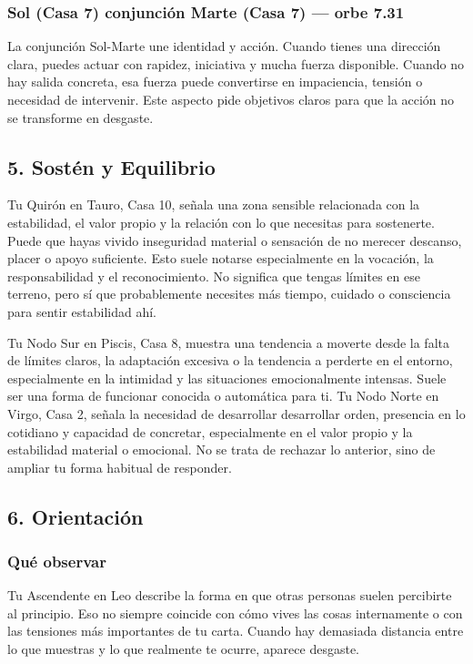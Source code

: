 \documentclass[11pt,a4paper]{article}
\begin{document}
\subsubsection*{Sol (Casa 7) conjunción Marte (Casa 7) --- orbe 7.31\textdegree}
La conjunción Sol-Marte une identidad y acción. Cuando tienes una dirección clara, puedes actuar con rapidez, iniciativa y mucha fuerza disponible. Cuando no hay salida concreta, esa fuerza puede convertirse en impaciencia, tensión o necesidad de intervenir. Este aspecto pide objetivos claros para que la acción no se transforme en desgaste.



\subsection{5. Sostén y Equilibrio}

Tu Quirón en Tauro, Casa 10, señala una zona sensible relacionada con la estabilidad, el valor propio y la relación con lo que necesitas para sostenerte. Puede que hayas vivido inseguridad material o sensación de no merecer descanso, placer o apoyo suficiente. Esto suele notarse especialmente en la vocación, la responsabilidad y el reconocimiento. No significa que tengas límites en ese terreno, pero sí que probablemente necesites más tiempo, cuidado o consciencia para sentir estabilidad ahí.

\vspace{0.3cm}
Tu Nodo Sur en Piscis, Casa 8, muestra una tendencia a moverte desde la falta de límites claros, la adaptación excesiva o la tendencia a perderte en el entorno, especialmente en la intimidad y las situaciones emocionalmente intensas. Suele ser una forma de funcionar conocida o automática para ti. Tu Nodo Norte en Virgo, Casa 2, señala la necesidad de desarrollar desarrollar orden, presencia en lo cotidiano y capacidad de concretar, especialmente en el valor propio y la estabilidad material o emocional. No se trata de rechazar lo anterior, sino de ampliar tu forma habitual de responder.

\vspace{0.3cm}


\subsection{6. Orientación}

\subsubsection*{Qué observar}
Tu Ascendente en Leo describe la forma en que otras personas suelen percibirte al principio. Eso no siempre coincide con cómo vives las cosas internamente o con las tensiones más importantes de tu carta. Cuando hay demasiada distancia entre lo que muestras y lo que realmente te ocurre, aparece desgaste.
\end{document}
